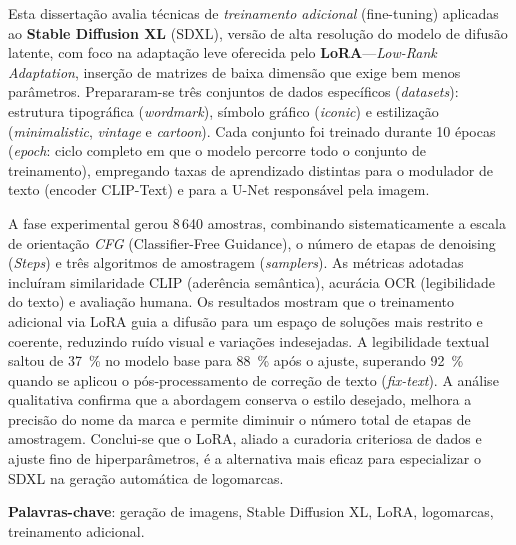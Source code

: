 \documentclass[12pt, %
openright, 
oneside, %
a4paper,    %
brazil]{facom-ufu-abntex2}
\begin{document}
\begin{resumo}
    Esta dissertação avalia técnicas de \emph{treinamento adicional} (fine-tuning) aplicadas ao \textbf{Stable Diffusion XL} (SDXL), versão de alta resolução do modelo de difusão latente, com foco na adaptação leve oferecida pelo \textbf{LoRA}—\emph{Low-Rank Adaptation}, inserção de matrizes de baixa dimensão que exige bem menos parâmetros. Prepararam-se três conjuntos de dados específicos (\emph{datasets}): estrutura tipográfica (\emph{wordmark}), símbolo gráfico (\emph{iconic}) e estilização (\emph{minimalistic}, \emph{vintage} e \emph{cartoon}). Cada conjunto foi treinado durante 10 épocas (\emph{epoch}: ciclo completo em que o modelo percorre todo o conjunto de treinamento), empregando taxas de aprendizado distintas para o modulador de texto (encoder CLIP-Text) e para a U-Net responsável pela imagem.

    A fase experimental gerou 8\,640 amostras, combinando sistematicamente a escala de orientação \emph{CFG} (Classifier-Free Guidance), o número de etapas de denoising (\emph{Steps}) e três algoritmos de amostragem (\emph{samplers}). As métricas adotadas incluíram similaridade CLIP (aderência semântica), acurácia OCR (legibilidade do texto) e avaliação humana. Os resultados mostram que o treinamento adicional via LoRA guia a difusão para um espaço de soluções mais restrito e coerente, reduzindo ruído visual e variações indesejadas. A legibilidade textual saltou de 37~\% no modelo base para 88~\% após o ajuste, superando 92~\% quando se aplicou o pós-processamento de correção de texto (\emph{fix-text}). A análise qualitativa confirma que a abordagem conserva o estilo desejado, melhora a precisão do nome da marca e permite diminuir o número total de etapas de amostragem. Conclui-se que o LoRA, aliado a curadoria criteriosa de dados e ajuste fino de hiperparâmetros, é a alternativa mais eficaz para especializar o SDXL na geração automática de logomarcas.  
    
    \vspace{\onelineskip}
    
    \noindent
    \textbf{Palavras-chave}: geração de imagens, Stable Diffusion XL, LoRA, logomarcas, treinamento adicional.
 \end{resumo}


\listoffigures*
\cleardoublepage


\listoftables*
\cleardoublepage
\end{document}

